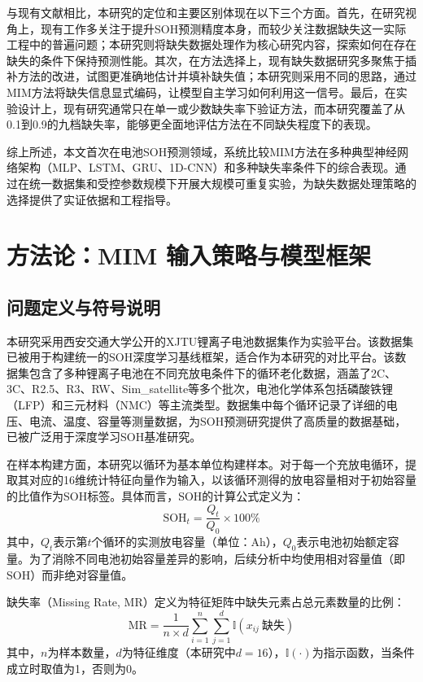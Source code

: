 \documentclass[10pt,a4paper]{ctexart}
\begin{document}
与现有文献相比，本研究的定位和主要区别体现在以下三个方面。首先，在研究视角上，现有工作多关注于提升SOH预测精度本身，而较少关注数据缺失这一实际工程中的普遍问题；本研究则将缺失数据处理作为核心研究内容，探索如何在存在缺失的条件下保持预测性能。其次，在方法选择上，现有缺失数据研究多聚焦于插补方法的改进，试图更准确地估计并填补缺失值；本研究则采用不同的思路，通过MIM方法将缺失信息显式编码，让模型自主学习如何利用这一信号。最后，在实验设计上，现有研究通常只在单一或少数缺失率下验证方法，而本研究覆盖了从0.1到0.9的九档缺失率，能够更全面地评估方法在不同缺失程度下的表现。

综上所述，本文首次在电池SOH预测领域，系统比较MIM方法在多种典型神经网络架构（MLP、LSTM、GRU、1D-CNN）和多种缺失率条件下的综合表现。通过在统一数据集和受控参数规模下开展大规模可重复实验，为缺失数据处理策略的选择提供了实证依据和工程指导。

\section{方法论：MIM 输入策略与模型框架}\label{sec:method}

\subsection{问题定义与符号说明}

本研究采用西安交通大学公开的XJTU锂离子电池数据集作为实验平台\cite{wang2024open,duan2025lithium}。该数据集已被用于构建统一的SOH深度学习基线框架\cite{wang2024open}，适合作为本研究的对比平台。该数据集包含了多种锂离子电池在不同充放电条件下的循环老化数据，涵盖了2C、3C、R2.5、R3、RW、Sim\_satellite等多个批次，电池化学体系包括磷酸铁锂（LFP）和三元材料（NMC）等主流类型。数据集中每个循环记录了详细的电压、电流、温度、容量等测量数据，为SOH预测研究提供了高质量的数据基础，已被广泛用于深度学习SOH基准研究\cite{wang2024pinn}。

在样本构建方面，本研究以循环为基本单位构建样本。对于每一个充放电循环，提取其对应的16维统计特征向量作为输入，以该循环测得的放电容量相对于初始容量的比值作为SOH标签。具体而言，SOH的计算公式定义为：
\begin{equation}
    \text{SOH}_t = \frac{Q_t}{Q_0} \times 100\%
\end{equation}
其中，$Q_t$表示第$t$个循环的实测放电容量（单位：Ah），$Q_0$表示电池初始额定容量。为了消除不同电池初始容量差异的影响，后续分析中均使用相对容量值（即SOH）而非绝对容量值。

缺失率（Missing Rate, MR）定义为特征矩阵中缺失元素占总元素数量的比例：
\begin{equation}
    \text{MR} = \frac{1}{n \times d} \sum_{i=1}^{n}\sum_{j=1}^{d} \mathbb{I}(x_{ij}\ \text{缺失})
    \label{eq:mr}
\end{equation}
其中，$n$为样本数量，$d$为特征维度（本研究中$d=16$），$\mathbb{I}(\cdot)$为指示函数，当条件成立时取值为1，否则为0。
\end{document}

